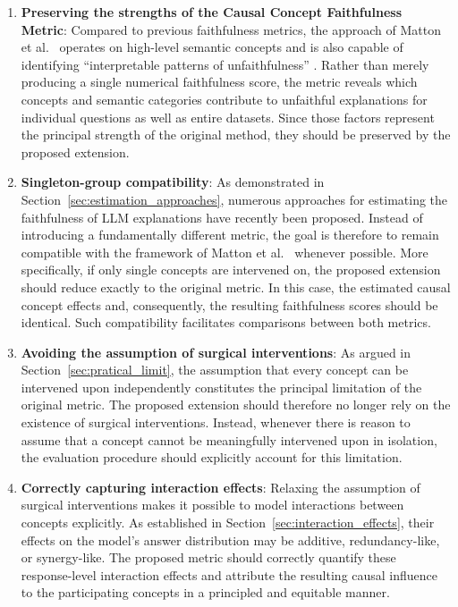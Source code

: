 \begin{enumerate}[
		label=\textbf{R\arabic*},
		ref=R\arabic*,
		wide=0pt,
		leftmargin=0pt
	]
	\item \label{req:preserving_strengths} \textbf{Preserving the strengths of the Causal Concept Faithfulness Metric}:
	      Compared to previous faithfulness metrics, the approach of Matton et al.~\cite{mattonWalkTalkMeasuring2024} operates on high-level semantic concepts and is also capable of identifying \enquote{interpretable patterns of unfaithfulness} \cite{mattonWalkTalkMeasuring2024}. Rather than merely producing a single numerical faithfulness score, the metric reveals which concepts and semantic categories contribute to unfaithful explanations for individual questions as well as entire datasets. Since those factors represent the principal strength of the original method, they should be preserved by the proposed extension.

	\item \label{req:one_item_group} \textbf{Singleton-group compatibility}:
	      As demonstrated in Section~\ref{sec:estimation_approaches}, numerous approaches for estimating the faithfulness of LLM explanations have recently been proposed. Instead of introducing a fundamentally different metric, the goal is therefore to remain compatible with the framework of Matton et al.~\cite{mattonWalkTalkMeasuring2024} whenever possible. More specifically, if only single concepts are intervened on, the proposed extension should reduce exactly to the original metric. In this case, the estimated causal concept effects and, consequently, the resulting faithfulness scores should be identical. Such compatibility facilitates comparisons between both metrics.

	\item \label{req:no_surgical} \textbf{Avoiding the assumption of surgical interventions}:
	      As argued in Section~\ref{sec:pratical_limit}, the assumption that every concept can be intervened upon independently constitutes the principal limitation of the original metric. The proposed extension should therefore no longer rely on the existence of surgical interventions. Instead, whenever there is reason to assume that a concept cannot be meaningfully intervened upon in isolation, the evaluation procedure should explicitly account for this limitation.

	\item \label{req:caputure_interaction} \textbf{Correctly capturing interaction effects}:
	      Relaxing the assumption of surgical interventions makes it possible to model interactions between concepts explicitly. As established in Section~\ref{sec:interaction_effects}, their effects on the model's answer distribution may be additive, redundancy-like, or synergy-like. The proposed metric should correctly quantify these response-level interaction effects and attribute the resulting causal influence to the participating concepts in a principled and equitable manner.


\end{enumerate}
